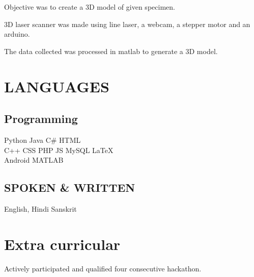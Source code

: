 \documentclass[]{deedy-resume-openfont}
\begin{document}
\begin{tightemize}
\item Objective was to create a 3D model of given specimen.
\item 3D laser scanner was made using line laser, a webcam, a stepper motor and an arduino.
\item The data collected was processed in matlab to generate a 3D model.
\linebreak
\end{tightemize}
\sectionsep


\section{LANGUAGES}

\begin{minipage}[t]{0.60\textwidth} 

\subsection{Programming}
Python \textbullet{}   Java \textbullet{} C\# \textbullet{} HTML \\
C++\textbullet{} CSS \textbullet{} PHP \textbullet{} JS \textbullet{} MySQL \textbullet{} \LaTeX\ \\
Android \textbullet{} MATLAB
\sectionsep

%
%

\end{minipage} 
\hfill
\begin{minipage}[t]{0.30\textwidth} 

\subsection{SPOKEN \& WRITTEN}
English, Hindi
Sanskrit
\sectionsep

\end{minipage} 

\sectionsep


\section{Extra curricular}
\begin{tightemize}
\item{Actively participated and qualified four consecutive hackathon.}
\end{tightemize}
\sectionsep
\end{document}

